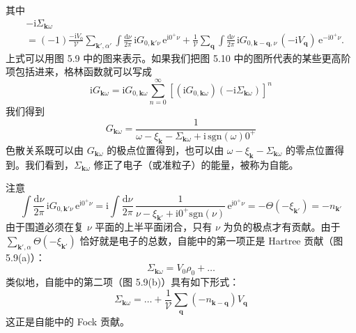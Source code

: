 

其中
\begin{align*}
&-\mathrm{i}\Sigma_{\pmb{k}\omega}\\
&=(-1)\frac{-\mathrm{i}V_{0}}{\mathcal{V}}\sum_{\pmb{k}',\alpha'}\int \frac{\mathrm{d}\nu}{2\pi}\,\mathrm{i}G_{0,\pmb{k}'\nu}\,\mathrm{e}^{\mathrm{i}0^{+}\nu}+\frac{1}{\mathcal{V}}\sum_{\pmb{q}}\int \frac{\mathrm{d}\nu}{2\pi}\,\mathrm{i}G_{0,\pmb{k}-\pmb{q},\nu}\,(-\mathrm{i}V_{\pmb{q}})\,\mathrm{e}^{-\mathrm{i}0^{+}\nu}.
\end{align*}
上式可以用图 5.9 中的图来表示。如果我们把图 5.10 中的图所代表的某些更高阶项包括进来，格林函数就可以写成
\begin{equation*}
\mathrm{i}G_{\pmb{k}\omega}=\mathrm{i}G_{0,\pmb{k}\omega}\sum_{n=0}^{\infty}\left[(\mathrm{i}G_{0,\pmb{k}\omega})(-\mathrm{i}\Sigma_{\pmb{k}\omega})\right]^{n}
\end{equation*}
我们得到
\begin{equation*}
G_{\pmb{k}\omega}=\frac{1}{\omega-\xi_{\pmb{k}}-\Sigma_{\pmb{k}\omega}+\mathrm{i}\,\mathrm{sgn}(\omega)0^{+}}
\end{equation*}
色散关系既可以由 $G_{\pmb{k}\omega}$ 的极点位置得到，也可以由 $\omega-\xi_{\pmb{k}}-\Sigma_{\pmb{k}\omega}$ 的零点位置得到。我们看到，$\Sigma_{\pmb{k}\omega}$ 修正了电子（或准粒子）的能量，被称为自能。

注意
\begin{equation*}
\int \frac{\mathrm{d}\nu}{2\pi}\,\mathrm{i}G_{0,\pmb{k}'\nu}\,\mathrm{e}^{\mathrm{i}0^{+}\nu}=\mathrm{i}\int \frac{\mathrm{d}\nu}{2\pi}\,\frac{1}{\nu-\xi_{\pmb{k}'}+\mathrm{i}0^{+}\mathrm{sgn}(\nu)}\,\mathrm{e}^{\mathrm{i}0^{+}\nu}=-\Theta(-\xi_{\pmb{k}'})=-n_{\pmb{k}'}
\end{equation*}
由于围道必须在复 $\nu$ 平面的上半平面闭合，只有 $\nu$ 为负的极点才有贡献。由于 $\sum_{\pmb{k}',\alpha}\Theta(-\xi_{\pmb{k}'})$ 恰好就是电子的总数，自能中的第一项正是 Hartree 贡献（图 5.9(a)）：
\begin{equation*}
\Sigma_{\pmb{k}\omega}=V_{0}\rho_{0}+\dots
\end{equation*}
类似地，自能中的第二项（图 5.9(b)）具有如下形式：
\begin{equation*}
\Sigma_{\pmb{k}\omega}=\dots+\frac{1}{\mathcal{V}}\sum_{\pmb{q}}(-n_{\pmb{k}-\pmb{q}})V_{\pmb{q}}
\end{equation*}
这正是自能中的 Fock 贡献。

